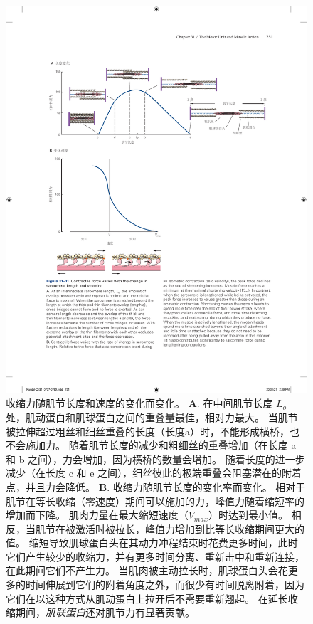 \begin{figure}[htbp]
	\centering
	\includegraphics[width=1.0\linewidth]{chap31/fig_31_11}
	\caption{收缩力随肌节长度和速度的变化而变化。
	\textbf{A}. 在中间肌节长度 $ L_o $ 处，肌动蛋白和肌球蛋白之间的重叠量最佳，相对力最大。
	当肌节被拉伸超过粗丝和细丝重叠的长度（长度a）时，不能形成横桥，也不会施加力。
	随着肌节长度的减少和粗细丝的重叠增加（在长度 a 和 b 之间），力会增加，因为横桥的数量会增加。
	随着长度的进一步减少（在长度 c 和 e 之间），细丝彼此的极端重叠会阻塞潜在的附着点，并且力会降低。
	\textbf{B}. 收缩力随肌节长度的变化率而变化。
	相对于肌节在等长收缩（零速度）期间可以施加的力，峰值力随着缩短率的增加而下降。
	肌肉力量在最大缩短速度（$ V_{max} $）时达到最小值。
	相反，当肌节在被激活时被拉长，峰值力增加到比等长收缩期间更大的值。
	缩短导致肌球蛋白头在其动力冲程结束时花费更多时间，此时它们产生较少的收缩力，并有更多时间分离、重新击中和重新连接，在此期间它们不产生力。
	当肌肉被主动拉长时，肌球蛋白头会花更多的时间伸展到它们的附着角度之外，而很少有时间脱离附着，因为它们在以这种方式从肌动蛋白上拉开后不需要重新翘起。
	在延长收缩期间，\textit{肌联蛋白}还对肌节力有显著贡献。}
	\label{fig:31_11}
\end{figure}


